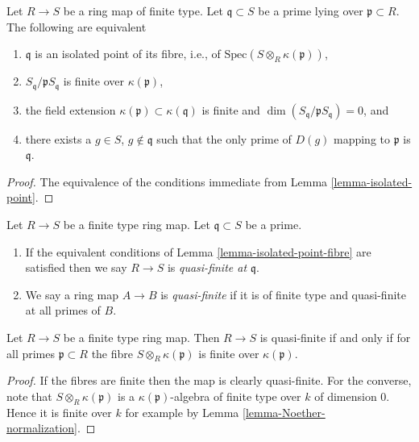 \begin{lemma}
\label{lemma-isolated-point-fibre}
Let $R \to S$ be a ring map of finite type.
Let $\mathfrak q \subset S$ be a prime lying over
$\mathfrak p \subset R$. The following are equivalent
\begin{enumerate}
\item $\mathfrak q$ is an isolated point of
its fibre, i.e., of $\text{Spec}(S \otimes_R \kappa(\mathfrak p))$,
\item $S_{\mathfrak q}/\mathfrak pS_{\mathfrak q}$ is finite over
$\kappa(\mathfrak p)$,
\item the field extension $\kappa(\mathfrak p) \subset \kappa(\mathfrak q)$
is finite and $\dim(S_{\mathfrak q}/\mathfrak pS_{\mathfrak q}) = 0$, and
\item there exists a $g \in S$, $g \not \in \mathfrak q$ such that
the only prime of $D(g)$ mapping to $\mathfrak p$
is $\mathfrak q$.
\end{enumerate}
\end{lemma}

\begin{proof}
The equivalence of the conditions immediate from
Lemma \ref{lemma-isolated-point}.
\end{proof}

\begin{definition}
\label{definition-quasi-finite}
Let $R \to S$ be a finite type ring map.
Let $\mathfrak q \subset S$ be a prime.
\begin{enumerate}
\item If the equivalent conditions of Lemma \ref{lemma-isolated-point-fibre}
are satisfied then we say $R \to S$ is {\it quasi-finite at $\mathfrak q$}.
\item We say a ring map $A \to B$ is {\it quasi-finite}
if it is of finite type and quasi-finite at all primes of $B$.
\end{enumerate}
\end{definition}

\begin{lemma}
\label{lemma-quasi-finite}
Let $R \to S$ be a finite type ring map.
Then $R \to S$ is quasi-finite if and only if for all
primes $\mathfrak p \subset R$
the fibre $S \otimes_R \kappa(\mathfrak p)$ is finite
over $\kappa(\mathfrak p)$.
\end{lemma}

\begin{proof}
If the fibres are finite then the map is clearly quasi-finite.
For the converse, note that $S \otimes_R \kappa(\mathfrak p)$
is a $\kappa(\mathfrak p)$-algebra of finite type over
$k$ of dimension $0$. Hence it is finite over $k$ for example
by Lemma \ref{lemma-Noether-normalization}.
\end{proof}


